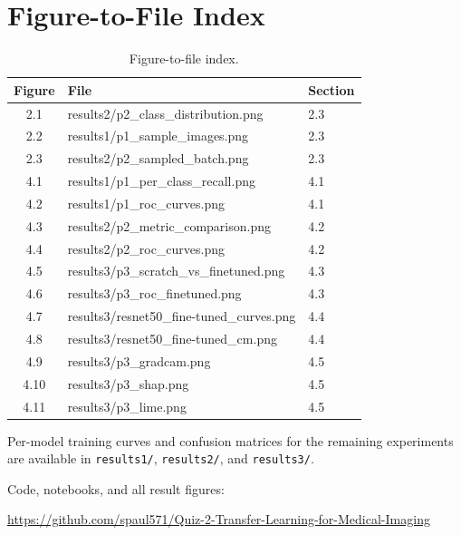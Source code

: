 \documentclass[11pt,a4paper]{article}
\numberwithin{figure}{section}
\numberwithin{table}{section}
\let\oldsection\section
\renewcommand{\section}{\clearpage\oldsection}
\begin{document}
\section{Figure-to-File Index}
\begin{table}[H]
\centering
\caption{Figure-to-file index.}
\label{tab:appB}
\begin{tabular}{cll}
\toprule
Figure & File & Section \\
\midrule
2.1 & results2/p2\_class\_distribution.png & 2.3 \\
2.2 & results1/p1\_sample\_images.png & 2.3 \\
2.3 & results2/p2\_sampled\_batch.png & 2.3 \\
4.1 & results1/p1\_per\_class\_recall.png & 4.1 \\
4.2 & results1/p1\_roc\_curves.png & 4.1 \\
4.3 & results2/p2\_metric\_comparison.png & 4.2 \\
4.4 & results2/p2\_roc\_curves.png & 4.2 \\
4.5 & results3/p3\_scratch\_vs\_finetuned.png & 4.3 \\
4.6 & results3/p3\_roc\_finetuned.png & 4.3 \\
4.7 & results3/resnet50\_fine-tuned\_curves.png & 4.4 \\
4.8 & results3/resnet50\_fine-tuned\_cm.png & 4.4 \\
4.9 & results3/p3\_gradcam.png & 4.5 \\
4.10 & results3/p3\_shap.png & 4.5 \\
4.11 & results3/p3\_lime.png & 4.5 \\
\bottomrule
\end{tabular}
\end{table}
Per-model training curves and confusion matrices for the remaining experiments are available in
\texttt{results1/}, \texttt{results2/}, and \texttt{results3/}.

\vspace{1.0cm}
\begin{center}
{\small
Code, notebooks, and all result figures:\par
\url{https://github.com/spaul571/Quiz-2-Transfer-Learning-for-Medical-Imaging}
}
\end{center}
\end{document}
